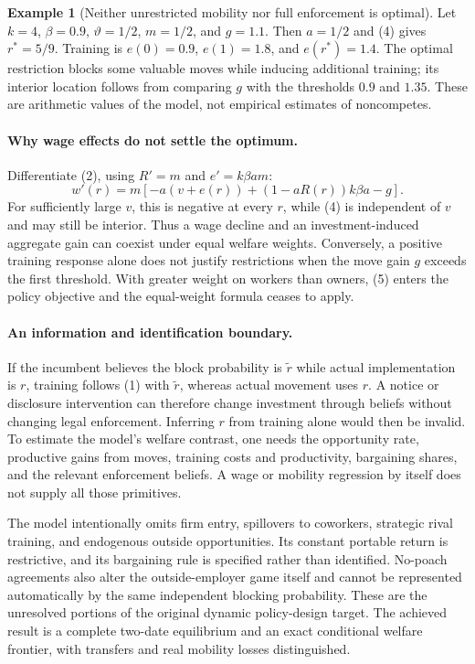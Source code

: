 \documentclass[11pt]{article}
\theoremstyle{definition}
\newtheorem{example}[theorem]{Example}
\begin{document}
\begin{example}[Neither unrestricted mobility nor full enforcement is optimal]
Let $k=4$, $\beta=0.9$, $\vartheta=1/2$, $m=1/2$, and $g=1.1$. Then $a=1/2$ and (4) gives $r^*=5/9$. Training is $e(0)=0.9$, $e(1)=1.8$, and $e(r^*)=1.4$. The optimal restriction blocks some valuable moves while inducing additional training; its interior location follows from comparing $g$ with the thresholds $0.9$ and $1.35$. These are arithmetic values of the model, not empirical estimates of noncompetes.
\end{example}

\paragraph{Why wage effects do not settle the optimum.}
Differentiate (2), using $R'=m$ and $e'=k\beta am$:
\[
 w'(r)=m\left[-a(v+e(r))+(1-aR(r))k\beta a-g\right].
 \tag{5}
\]
For sufficiently large $v$, this is negative at every $r$, while (4) is independent of $v$ and may still be interior. Thus a wage decline and an investment-induced aggregate gain can coexist under equal welfare weights. Conversely, a positive training response alone does not justify restrictions when the move gain $g$ exceeds the first threshold. With greater weight on workers than owners, (5) enters the policy objective and the equal-weight formula ceases to apply.

\paragraph{An information and identification boundary.}
If the incumbent believes the block probability is $\widetilde r$ while actual implementation is $r$, training follows (1) with $\widetilde r$, whereas actual movement uses $r$. A notice or disclosure intervention can therefore change investment through beliefs without changing legal enforcement. Inferring $r$ from training alone would then be invalid. To estimate the model's welfare contrast, one needs the opportunity rate, productive gains from moves, training costs and productivity, bargaining shares, and the relevant enforcement beliefs. A wage or mobility regression by itself does not supply all those primitives.

The model intentionally omits firm entry, spillovers to coworkers, strategic rival training, and endogenous outside opportunities. Its constant portable return is restrictive, and its bargaining rule is specified rather than identified. No-poach agreements also alter the outside-employer game itself and cannot be represented automatically by the same independent blocking probability. These are the unresolved portions of the original dynamic policy-design target. The achieved result is a complete two-date equilibrium and an exact conditional welfare frontier, with transfers and real mobility losses distinguished.
\end{document}

